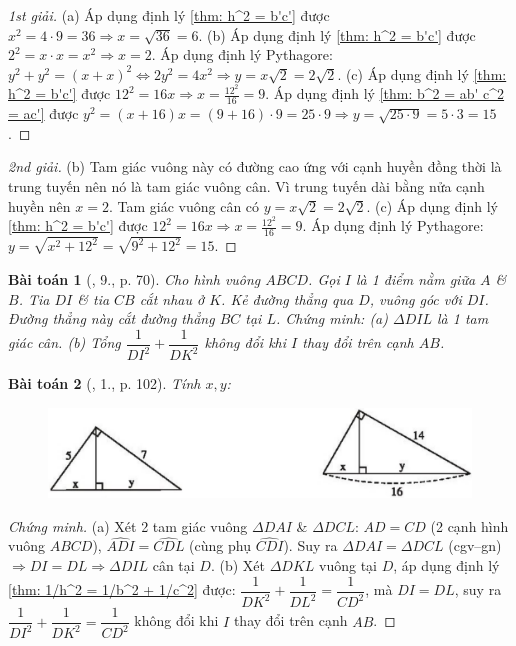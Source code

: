 \documentclass{article}
\newtheorem{baitoan}{Bài toán}
\begin{document}
\begin{proof}[1st giải]
	(a) Áp dụng định lý \ref{thm: h^2 = b'c'} được $x^2 = 4\cdot9 = 36\Rightarrow x = \sqrt{36} = 6$. (b) Áp dụng định lý \ref{thm: h^2 = b'c'} được $2^2 = x\cdot x = x^2\Rightarrow x = 2$. Áp dụng định lý Pythagore: $y^2 + y^2 = (x + x)^2\Leftrightarrow 2y^2 = 4x^2\Rightarrow y = x\sqrt{2} = 2\sqrt{2}$. (c) Áp dụng định lý \ref{thm: h^2 = b'c'} được $12^2 = 16x\Rightarrow x = \frac{12^2}{16} = 9$. Áp dụng định lý \ref{thm: b^2 = ab' c^2 = ac'} được $y^2 = (x + 16)x = (9 + 16)\cdot9 = 25\cdot9\Rightarrow y = \sqrt{25\cdot9} = 5\cdot3 = 15$.
\end{proof}

\begin{proof}[2nd giải]
	(b) Tam giác vuông này có đường cao ứng với cạnh huyền đồng thời là trung tuyến nên nó là tam giác vuông cân. Vì trung tuyến dài bằng nửa cạnh huyền nên $x = 2$. Tam giác vuông cân có $y = x\sqrt{2} = 2\sqrt{2}$. (c) Áp dụng định lý \ref{thm: h^2 = b'c'} được $12^2 = 16x\Rightarrow x = \frac{12^2}{16} = 9$. Áp dụng định lý Pythagore: $y = \sqrt{x^2 + 12^2} = \sqrt{9^2 + 12^2} = 15$.
\end{proof}

\begin{baitoan}[\cite{SGK_Toan_9_tap_1}, 9., p. 70]
	Cho hình vuông $ABCD$. Gọi $I$ là 1 điểm nằm giữa $A$ \& $B$. Tia $DI$ \& tia $CB$ cắt nhau ở $K$. Kẻ đường thẳng qua $D$, vuông góc với $DI$. Đường thẳng này cắt đường thẳng $BC$ tại $L$. Chứng minh: (a) $\Delta DIL$ là 1 tam giác cân. (b) Tổng $\dfrac{1}{DI^2} + \dfrac{1}{DK^2}$ không đổi khi $I$ thay đổi trên cạnh $AB$.	
\end{baitoan}

\begin{baitoan}[\cite{SBT_Toan_9_tap_1}, 1., p. 102]
	Tính $x,y$:
	\begin{figure}[H]
		\centering
		\includegraphics[scale=.25]{SBT_Toan_9_1_p102}
	\end{figure}
\end{baitoan}

\begin{proof}[Chứng minh]
	(a) Xét 2 tam giác vuông $\Delta DAI$ \& $\Delta DCL$: $AD = CD$ (2 cạnh hình vuông $ABCD$), $\widehat{ADI} = \widehat{CDL}$ (cùng phụ $\widehat{CDI}$). Suy ra $\Delta DAI = \Delta DCL$ (cgv--gn) $\Rightarrow DI = DL\Rightarrow\Delta DIL$ cân tại $D$. (b) Xét $\Delta DKL$ vuông tại $D$, áp dụng định lý \ref{thm: 1/h^2 = 1/b^2 + 1/c^2} được: $\dfrac{1}{DK^2} + \dfrac{1}{DL^2} = \dfrac{1}{CD^2}$, mà $DI = DL$, suy ra $\dfrac{1}{DI^2} + \dfrac{1}{DK^2} = \dfrac{1}{CD^2}$ không đổi khi $I$ thay đổi trên cạnh $AB$. 
\end{proof}
\end{document}
